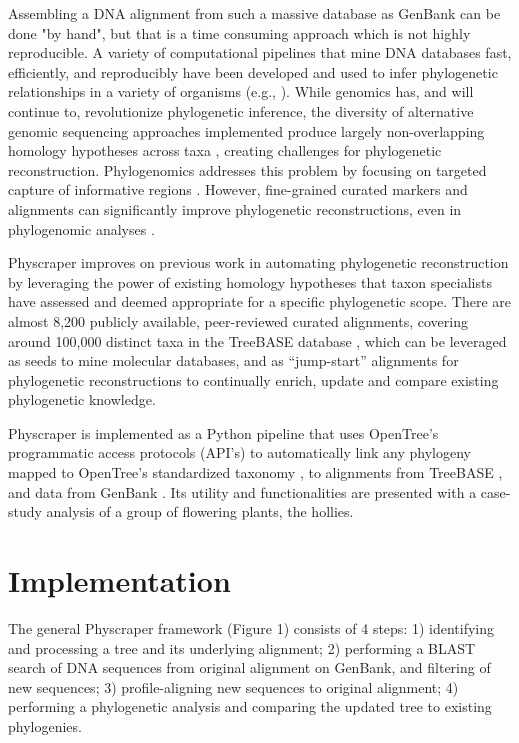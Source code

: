\documentclass{bmcart}
\begin{document}
Assembling a DNA alignment from such a massive database as GenBank can be done "by hand",
but that is a time consuming approach which is not highly reproducible.
A variety of computational pipelines that mine DNA databases fast, efficiently, and reproducibly
have been developed and used to infer phylogenetic relationships in a variety of organisms
(e.g., \cite{smith2009mega, antonelli2017toward, izquierdo2014pumper, pearse2013phylogenerator}).
While genomics has, and will continue to, revolutionize phylogenetic inference,
the diversity of alternative genomic sequencing approaches implemented produce
largely non-overlapping homology hypotheses across taxa \cite{jones2016targeted},
creating challenges for phylogenetic reconstruction.
Phylogenomics addresses this problem by focusing on targeted capture of informative
regions \cite{andermann2020guide}.
However, fine-grained curated markers and alignments can significantly improve phylogenetic
reconstructions, even in phylogenomic analyses \cite{fragoso2017pilot}.

Physcraper improves on previous work in automating phylogenetic reconstruction by leveraging
the power of existing homology hypotheses that taxon specialists have assessed
and deemed appropriate for a specific phylogenetic scope.
There are almost 8,200 publicly available, peer-reviewed curated alignments, covering
around 100,000 distinct taxa in the TreeBASE database \cite{piel2009treebase}, which
can be leveraged as seeds to mine molecular databases, and as ``jump-start'' alignments
for phylogenetic reconstructions \cite{morrison2006multiple} to continually enrich,
update and compare existing phylogenetic knowledge.

Physcraper is implemented as a Python pipeline that uses OpenTree's programmatic access
protocols (API's) to automatically
link any phylogeny mapped to OpenTree's standardized taxonomy \cite{mctavish2015phylesystem},
to alignments
from TreeBASE \cite{sanderson1994treebase}, and data from GenBank \cite{benson2000genbank}.
Its utility and functionalities are presented with a case-study analysis of a
group of flowering plants, the hollies.


\section*{Implementation}

The general Physcraper framework (Figure 1) consists of 4 steps: 1) identifying and
processing a tree and its underlying alignment; 2) performing a BLAST search of
DNA sequences from original alignment on GenBank, and filtering of new sequences;
3) profile-aligning new sequences to original alignment; 4) performing a phylogenetic
analysis and comparing the updated tree to existing phylogenies.
\end{document}
